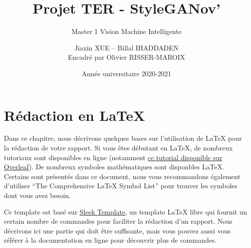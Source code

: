 \documentclass[a4paper, 12pt]{report}
\institute{Université de Paris}
\title{Projet TER - StyleGANov'}
\subtitle{Master 1 Vision Machine Intelligente}
\author{Jiaxin \textsc{XUE} -- Billal \textsc{IHADDADEN}\\
{\small Encadré par Olivier \textsc{RISSER-MAROIX}}}
\date{Année universitaire 2020-2021}
\begin{document}
    \maketitle

    \romantableofcontents

    
    
    
    
    
    
    
    
    
    
    
    

    \chapter{Rédaction en \LaTeX}
    Dans ce chapitre, nous décrivons quelques bases sur l'utilisation de \LaTeX{} pour la rédaction de votre rapport.
    Si vous êtes débutant en \LaTeX{}, de nombreux tutoriaux sont disponibles en ligne (notamment \href{https://www.overleaf.com/learn}{ce tutorial disponible sur Overleaf}). De nombreux symboles mathématiques sont disponbles \LaTeX{}. Certains sont présentés dans ce document, nous vous recommandons également d'utiliser \enquote{The Comprehensive \LaTeX{} Symbol List} \cite{pakin2020comprehensive} pour trouver les symboles dont vous avez besoin.
    
    Ce template est basé sur \href{https://fr.overleaf.com/latex/templates/sleek-template/hrksrrdywhfk}{Sleek Template}, un template \LaTeX{} libre qui fournit un certain nombre de commandes pour faciliter la rédaction d'un rapport. Nous décrivons ici une partie qui doit être suffisante, mais vous pouvez aussi vous référer à la documentation en ligne pour découvrir plus de commandes.
    
\end{document}
